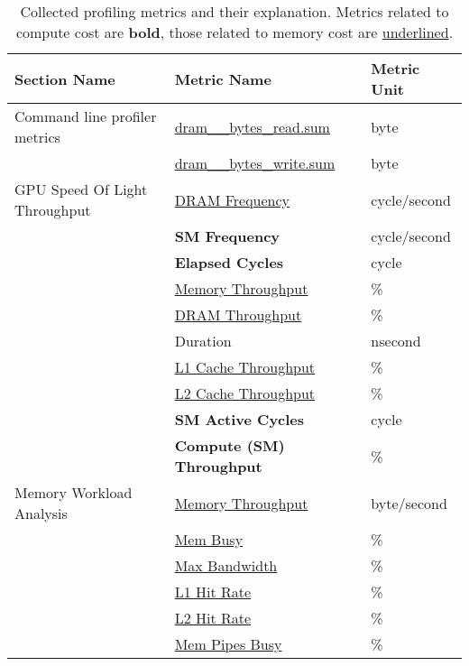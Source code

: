 \begin{table}[t]
  \begin{tabular}{lll}
    \toprule
    Section Name                  & Metric Name                          & Metric Unit  \\
    \midrule\midrule
    Command line profiler metrics & \underline{dram\_\_bytes\_read.sum}  & byte         \\
                                  & \underline{dram\_\_bytes\_write.sum} & byte         \\
    GPU Speed Of Light Throughput & \underline{DRAM Frequency}           & cycle/second \\
                                  & \textbf{SM Frequency}                & cycle/second \\
                                  & \textbf{Elapsed Cycles}              & cycle        \\
                                  & \underline{Memory Throughput}        & \%           \\
                                  & \underline{DRAM Throughput}          & \%           \\
                                  & Duration                             & nsecond      \\
                                  & \underline{L1 Cache Throughput}      & \%           \\
                                  & \underline{L2 Cache Throughput}      & \%           \\
                                  & \textbf{SM Active Cycles}            & cycle        \\
                                  & \textbf{Compute (SM) Throughput}     & \%           \\
    Memory Workload Analysis      & \underline{Memory Throughput}        & byte/second  \\
                                  & \underline{Mem Busy}                 & \%           \\
                                  & \underline{Max Bandwidth}            & \%           \\
                                  & \underline{L1 Hit Rate}              & \%           \\
                                  & \underline{L2 Hit Rate}              & \%           \\
                                  & \underline{Mem Pipes Busy}           & \%           \\
    \bottomrule
  \end{tabular}
  \caption[Collected profiling metrics and their explanation]{Collected profiling metrics and their explanation. Metrics related to compute cost are \textbf{bold}, those related to memory cost are \underline{underlined}.}
  \label{tab:4-profiling-metrics}
\end{table}


